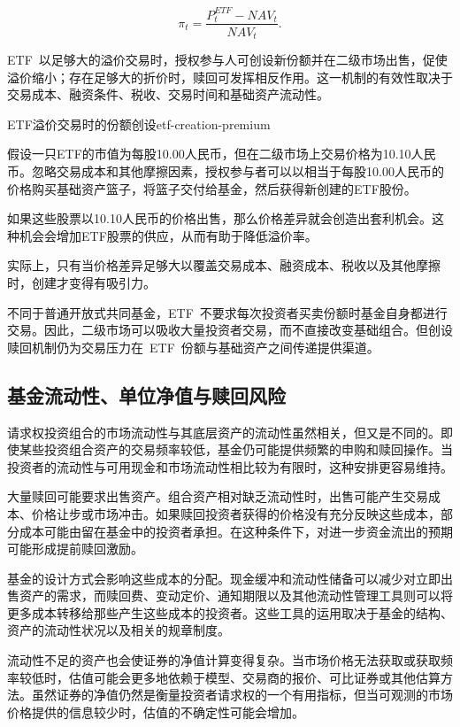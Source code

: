 \begin{equation}
\pi_t=
\frac{P_t^{ETF}-\textit{NAV}_t}{\textit{NAV}_t}.
\label{eq:ch14-etf-premium-discount}
\end{equation}

ETF~以足够大的溢价交易时，授权参与人可创设新份额并在二级市场出售，促使溢价缩小；存在足够大的折价时，赎回可发挥相反作用。这一机制的有效性取决于交易成本、融资条件、税收、交易时间和基础资产流动性。

\begin{example}{ETF溢价交易时的份额创设}{etf-creation-premium}

假设一只ETF的市值为每股10.00人民币，但在二级市场上交易价格为10.10人民币。忽略交易成本和其他摩擦因素，授权参与者可以以相当于每股10.00人民币的价格购买基础资产篮子，将篮子交付给基金，然后获得新创建的ETF股份。

如果这些股票以10.10人民币的价格出售，那么价格差异就会创造出套利机会。这种机会会增加ETF股票的供应，从而有助于降低溢价率。

实际上，只有当价格差异足够大以覆盖交易成本、融资成本、税收以及其他摩擦时，创建才变得有吸引力。

\end{example}

不同于普通开放式共同基金，ETF~不要求每次投资者买卖份额时基金自身都进行交易。因此，二级市场可以吸收大量投资者交易，而不直接改变基础组合。但创设赎回机制仍为交易压力在~ETF~份额与基础资产之间传递提供渠道。

\subsection{基金流动性、单位净值与赎回风险}

请求权投资组合的市场流动性与其底层资产的流动性虽然相关，但又是不同的。即使某些投资组合资产的交易频率较低，基金仍可能提供频繁的申购和赎回操作。当投资者的流动性与可用现金和市场流动性相比较为有限时，这种安排更容易维持。

大量赎回可能要求出售资产。组合资产相对缺乏流动性时，出售可能产生交易成本、价格让步或市场冲击。如果赎回投资者获得的价格没有充分反映这些成本，部分成本可能由留在基金中的投资者承担。在这种条件下，对进一步资金流出的预期可能形成提前赎回激励。

基金的设计方式会影响这些成本的分配。现金缓冲和流动性储备可以减少对立即出售资产的需求，而赎回费、变动定价、通知期限以及其他流动性管理工具则可以将更多成本转移给那些产生这些成本的投资者。这些工具的运用取决于基金的结构、资产的流动性状况以及相关的规章制度。

流动性不足的资产也会使证券的净值计算变得复杂。当市场价格无法获取或获取频率较低时，估值可能会更多地依赖于模型、交易商的报价、可比证券或其他估算方法。虽然证券的净值仍然是衡量投资者请求权的一个有用指标，但当可观测的市场价格提供的信息较少时，估值的不确定性可能会增加。

